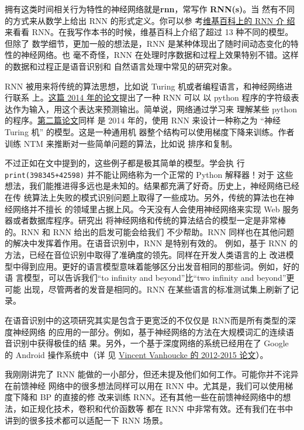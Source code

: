 拥有这类时间相关行为特性的神经网络就是\textbf{\gls{rnn}}，常写作 \textbf{RNN(s)}。当
然有不同的方式来从数学上给出 RNN 的形式定义。你可以参
考\href{http://en.wikipedia.org/wiki/Recurrent_neural_network}{维基百科上的 RNN 介
  绍}来看看 RNN。在我写作本书的时候，维基百科上介绍了超过 13 种不同的模型。但除了
数学细节，更加一般的想法是，RNN 是某种体现出了随时间动态变化的特性的神经网络。也
毫不奇怪，RNN 在处理时序数据和过程上效果特别不错。这样的数据和过程正是语音识别和
自然语言处理中常见的研究对象。

RNN 被用来将传统的算法思想，比如说 Turing 机或者编程语言，和神经网络进行联系
上。\href{http://arxiv.org/abs/1410.4615}{这篇 2014 年的论文}提出了一种 RNN 可以
以 python 程序的字符级表达作为输入，用这个表达来预测输出。简单说，网络通过学习来
理解某些 python 的程序。\href{http://arxiv.org/abs/1410.5401}{第二篇论文}同样
是 2014 年的，使用 RNN 来设计一种称之为 “神经 Turing 机” 的模型。这是一种通用机
器整个结构可以使用梯度下降来训练。作者训练 NTM 来推断对一些简单问题的算法，比如说
排序和复制。

不过正如在文中提到的，这些例子都是极其简单的模型。学会执
行 \lstinline!print(398345+42598)!  并不能让网络称为一个正常的 Python 解释器！对于
这些想法，我们能推进得多远也是未知的。结果都充满了好奇。历史上，神经网络已经在传
统算法上失败的模式识别问题上取得了一些成功。另外，传统的算法也在神经网络并不擅长
的领域里占据上风。今天没有人会使用神经网络来实现 Web 服务器或者数据库程序。研究出
将神经网络和传统的算法结合的模型一定是非常棒的。RNN 和 RNN 给出的启发可能会给我们
不少帮助。RNN 同样也在其他问题的解决中发挥着作用。在语音识别中，RNN 是特别有效的。
例如，基于 RNN 的方法，已经在音位识别中取得了准确度的领先。同样在开发人类语言的上
改进模型中得到应用。更好的语言模型意味着能够区分出发音相同的那些词。例如，好的语
言模型，可以告诉我们“to infinity and beyond”比“two infinity and beyond”更可能
出现，尽管两者的发音是相同的。RNN 在某些语言的标准测试集上刷新了记录。

在语音识别中的这项研究其实是包含于更宽泛的不仅仅是 RNN而是所有类型的深度神经网络
的应用的一部分。例如，基于神经网络的方法在大规模词汇的连续语音识别中获得极佳的结
果。另外，一个基于深度网络的系统已经用在了 Google 的 Android 操作系统中（详
见 \href{http://research.google.com/pubs/VincentVanhoucke.html}{Vincent
  Vanhoucke 的 2012-2015 论文}）。

我刚刚讲完了 RNN 能做的一小部分，但还未提及他们如何工作。可能你并不诧异在前馈神经
网络中的很多想法同样可以用在 RNN 中。尤其是，我们可以使用梯度下降和 BP 的直接的修
改来训练 RNN。还有其他一些在前馈神经网络中的想法，如正规化技术，卷积和代价函数等
都在 RNN 中非常有效。还有我们在书中讲到的很多技术都可以适配一下 RNN 场景。\\

